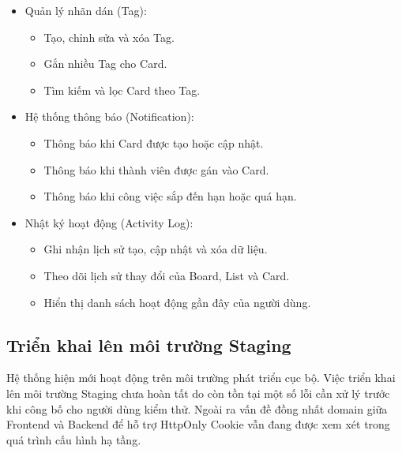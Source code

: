 \begin{itemize}
    \item Quản lý nhãn dán (Tag):
    \begin{itemize}
        \item Tạo, chỉnh sửa và xóa Tag.
        \item Gắn nhiều Tag cho Card.
        \item Tìm kiếm và lọc Card theo Tag.
    \end{itemize}

    \item Hệ thống thông báo (Notification):
    \begin{itemize}
        \item Thông báo khi Card được tạo hoặc cập nhật.
        \item Thông báo khi thành viên được gán vào Card.
        \item Thông báo khi công việc sắp đến hạn hoặc quá hạn.
    \end{itemize}

    \item Nhật ký hoạt động (Activity Log):
    \begin{itemize}
        \item Ghi nhận lịch sử tạo, cập nhật và xóa dữ liệu.
        \item Theo dõi lịch sử thay đổi của Board, List và Card.
        \item Hiển thị danh sách hoạt động gần đây của người dùng.
    \end{itemize}
\end{itemize}

\subsection{Triển khai lên môi trường Staging}

Hệ thống hiện mới hoạt động trên môi trường phát triển cục bộ.
Việc triển khai lên môi trường Staging chưa hoàn tất do còn tồn tại một số
lỗi cần xử lý trước khi công bố cho người dùng kiểm thử. Ngoài ra vấn đề
đồng nhất domain giữa Frontend và Backend để hỗ trợ HttpOnly Cookie vẫn
đang được xem xét trong quá trình cấu hình hạ tầng.
